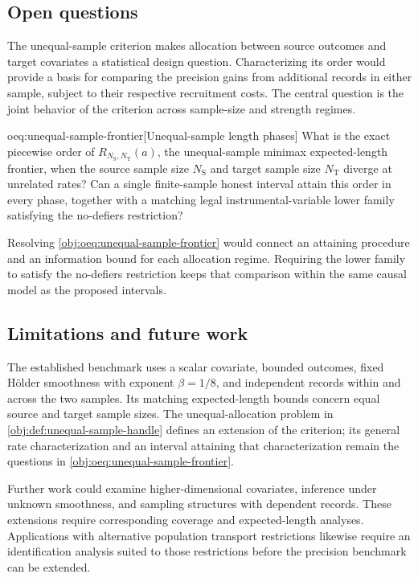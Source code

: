\documentclass[11pt]{article}
\begin{document}
\subsection{Open questions}

The unequal-sample criterion makes allocation between source outcomes and target covariates a statistical design question. Characterizing its order would provide a basis for comparing the precision gains from additional records in either sample, subject to their respective recruitment costs. The central question is the joint behavior of the criterion across sample-size and strength regimes.

\begin{remarkv}{oeq:unequal-sample-frontier}[Unequal-sample length phases]
What is the exact piecewise order of \(R_{N_{\mathrm S},N_{\mathrm T}}(a)\), the unequal-sample minimax expected-length frontier, when the source sample size \(N_{\mathrm S}\) and target sample size \(N_{\mathrm T}\) diverge at unrelated rates? Can a single finite-sample honest interval attain this order in every phase, together with a matching legal instrumental-variable lower family satisfying the no-defiers restriction?
\end{remarkv}

Resolving \cref{obj:oeq:unequal-sample-frontier} would connect an attaining procedure and an information bound for each allocation regime. Requiring the lower family to satisfy the no-defiers restriction keeps that comparison within the same causal model as the proposed intervals.

\subsection{Limitations and future work}

The established benchmark uses a scalar covariate, bounded outcomes, fixed Hölder smoothness with exponent \(\beta=1/8\), and independent records within and across the two samples. Its matching expected-length bounds concern equal source and target sample sizes. The unequal-allocation problem in \cref{obj:def:unequal-sample-handle} defines an extension of the criterion; its general rate characterization and an interval attaining that characterization remain the questions in \cref{obj:oeq:unequal-sample-frontier}.

Further work could examine higher-dimensional covariates, inference under unknown smoothness, and sampling structures with dependent records. These extensions require corresponding coverage and expected-length analyses. Applications with alternative population transport restrictions likewise require an identification analysis suited to those restrictions before the precision benchmark can be extended.
\end{document}
